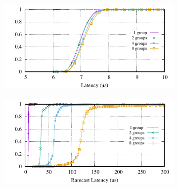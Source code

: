 \begin{figure}[ht]
  \begin{subfigure}{\columnwidth}
    \centering
    \includegraphics[width=0.95\columnwidth]{figures/benchmark/graphs/figure-genuine-compare-latency-cdf}
  \end{subfigure}
  \begin{subfigure}{\columnwidth}
    \centering
    \includegraphics[width=0.95\columnwidth]{figures/benchmark/graphs/figure-multi-dest-compare-latency-cdf-ramcast}
  \end{subfigure}


\end{figure}
